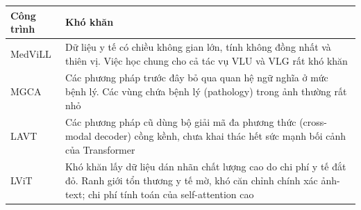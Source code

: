 \begin{frame}{\secname}
    \begin{table}
        \begin{tabular}{p{2cm}|p{8cm}}
            \toprule
            Công trình & Khó khăn \\
            \midrule
            \cite{moon_multi-modal_2021} MedViLL & Dữ liệu y tế có chiều không gian lớn, tính không đồng nhất và thiên vị. Việc học chung cho cả tác vụ VLU và VLG rất khó khăn \\
            \cite{wang_multi-granularity_2022} MGCA & Các phương pháp trước đây bỏ qua quan hệ ngữ nghĩa ở mức bệnh lý. Các vùng chứa bệnh lý (pathology) trong ảnh thường rất nhỏ \\
            \cite{yang_lavt_2021} LAVT & Các phương pháp cũ dùng bộ giải mã đa phương thức (cross-modal decoder) cồng kềnh, chưa khai thác hết sức mạnh bối cảnh của Transformer \\
            \cite{li_lvit_2023} LViT & Khó khăn lấy dữ liệu dán nhãn chất lượng cao do chi phí y tế đắt đỏ. Ranh giới tổn thương y tế mờ, khó căn chỉnh chính xác ảnh-text; chi phí tính toán của self-attention cao
        \end{tabular}
    \end{table}
\end{frame}